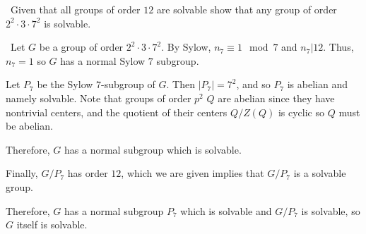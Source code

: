 \documentclass[12pt]{AlgebraQual}
\begin{document}
\begin{problem} $\,$
Given that all groups of order $12$ are solvable show that any group of order $2^2\cdot 3\cdot 7^2$ is solvable.
\end{problem}


\begin{solution}$\,$
Let $G$ be a group of order $2^2\cdot 3\cdot 7^2$. By Sylow, $n_7\equiv 1\mod 7$ and $n_7|12$. Thus, $n_7=1$ so $G$ has a normal Sylow $7$ subgroup.

Let $P_7$ be the Sylow $7$-subgroup of $G$. Then $|P_7|=7^2$, and so $P_7$ is abelian and namely solvable. Note that groups of order $p^2$ $Q$ are abelian since they have nontrivial centers, and the quotient of their centers $Q/Z(Q)$ is cyclic so $Q$ must be abelian.

Therefore, $G$ has a normal subgroup which is solvable.

Finally, $G/P_7$ has order $12$, which we are given implies that $G/P_7$ is a solvable group.

Therefore, $G$ has a normal subgroup $P_7$ which is solvable and $G/P_7$ is solvable, so $G$ itself is solvable.
\end{solution}
\newpage
\end{document}
